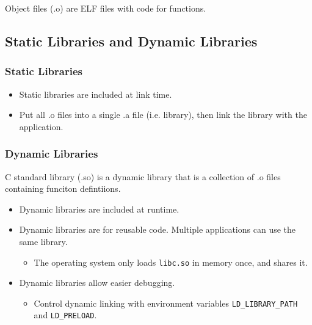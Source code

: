 \begin{notes}
    Object files (.o) are ELF files with code for functions.
\end{notes}

\subsection{Static Libraries and Dynamic Libraries}
\subsubsection{Static Libraries}
\begin{definition}
    \begin{itemize}
        \item Static libraries are included at link time.
    \end{itemize}
\end{definition}

\begin{notes}
    \begin{itemize}
        \item Put all .o files into a single .a file (i.e. library), then link the library with the application.
    \end{itemize}
\end{notes}

\subsubsection{Dynamic Libraries}
\begin{motivation}
    C standard library (.so) is a dynamic library that is a collection of .o files containing funciton defintiions.
\end{motivation}

\begin{definition}
    \begin{itemize}
        \item Dynamic libraries are included at runtime.
        \item Dynamic libraries are for reusable code. Multiple applications can use the same library.
        \begin{itemize}
            \item  The operating system only loads \texttt{libc.so} in memory once, and shares it.
        \end{itemize}
        \item Dynamic libraries allow easier debugging. 
        \begin{itemize}
            \item Control dynamic linking with environment variables \texttt{LD\_LIBRARY\_PATH} and \texttt{LD\_PRELOAD}.
        \end{itemize}
    \end{itemize}
\end{definition}

